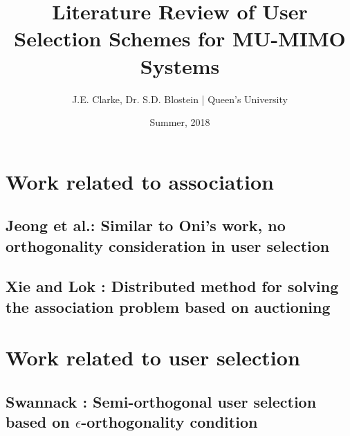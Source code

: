 \documentclass[11pt]{report}
\title{Literature Review of User Selection Schemes for MU-MIMO Systems}
\author{J.E. Clarke, Dr. S.D. Blostein | Queen's University}
\date{Summer, 2018}
\begin{document}
	\maketitle
	\newpage
    \section{Work related to association}
    	\subsection{Jeong et al.\cite{7354607}: Similar to Oni's work, no orthogonality consideration in user selection}
            	
        \subsection{Xie and Lok \cite{7510766}: Distributed method for solving the association problem based on auctioning}
            
    
    \section{Work related to user selection}
        \subsection{Swannack \cite{1549555}: Semi-orthogonal user selection based on $\epsilon$-orthogonality condition}
            
	\newpage	
 	\begingroup
 		\renewcommand{\section}[2]{}%
 		
 		
 	\endgroup
\end{document}
